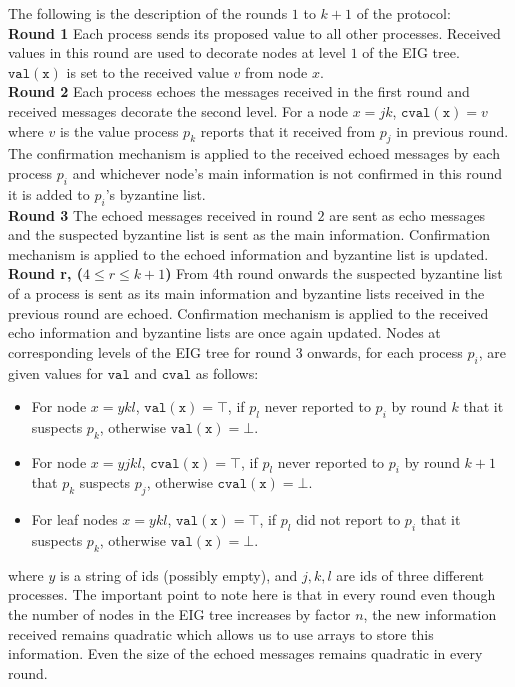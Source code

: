     The following is the description of the rounds $1$ to $k+1$ of the protocol: \\
    \textbf{Round 1} Each process sends its proposed value to all other processes. Received values in this round are used to decorate nodes at level $1$ of the EIG tree. $\mathtt{val(x)}$ is set to the received value $v$ from node $x$. \\
    \textbf{Round 2} Each process echoes the messages received in the first round and received messages decorate the second level. For a node $x = jk$, $\mathtt{cval(x)} = v$ where $v$ is the value process $p_k$ reports that it received from $p_j$ in previous round. The confirmation mechanism is applied to the received echoed messages by each process $p_i$ and whichever node's main information is not confirmed in this round it is added to $p_i$'s byzantine list. \\
    \textbf{Round 3} The echoed messages received in round $2$ are sent as echo messages and the suspected byzantine list is sent as the main information. Confirmation mechanism is applied to the echoed information and byzantine list is updated. \\
    \textbf{Round r, ($4 \leq r \leq k+1$)} From 4th round onwards the suspected byzantine list of a process is sent as its main information and byzantine lists received in the previous round are echoed. Confirmation mechanism is applied to the received echo information and byzantine lists are once again updated. Nodes at corresponding levels of the EIG tree for round 3 onwards, for each process $p_i$, are given values for $\mathtt{val}$ and $\mathtt{cval}$ as follows:
    \begin{itemize}
        \item For node $x=ykl$, $\mathtt{val(x)} = \top$, if $p_l$ never reported to $p_i$ by round $k$ that it suspects $p_k$, otherwise $\mathtt{val(x)} = \bot$.
        \item For node $x=yjkl$, $\mathtt{cval(x)} = \top$, if $p_l$ never reported to $p_i$ by round $k+1$ that $p_k$ suspects $p_j$, otherwise $\mathtt{cval(x)} = \bot$.
        \item For leaf nodes $x = ykl$, $\mathtt{val(x)} = \top$, if $p_l$ did not report to $p_i$ that it suspects $p_k$, otherwise $\mathtt{val(x)} = \bot$.
    \end{itemize}
where $y$ is a string of ids (possibly empty), and $j, k, l$ are ids of three different processes. The important point to note here is that in every round even though the number of nodes in the EIG tree increases by factor $n$, the new information received remains quadratic which allows us to use arrays to store this information. Even the size of the echoed messages remains quadratic in every round. 

